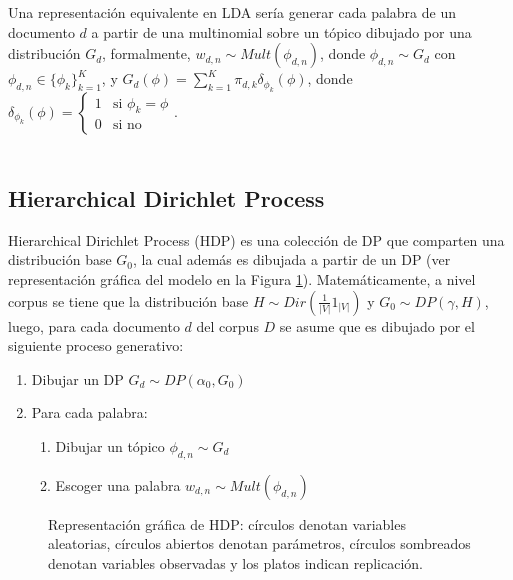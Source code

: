 \documentclass[letterpaper,12pt,oneside]{book} %
\begin{document}
Una representación equivalente en LDA sería generar cada palabra de un documento $d$ a partir de una multinomial sobre un tópico dibujado por una distribución $G_{d}$, formalmente, $w_{d,n}\sim Mult(\phi_{d,n})$, donde $\phi_{d,n} \sim G_{d}$ con $\phi_{d,n} \in \{\phi_{k}\}_{k=1}^{K}$, y $G_{d}(\phi)=\sum_{k=1}^{K}\pi_{d, k}\delta_{\phi_{k}}(\phi)$, donde $\delta_{\phi_{k}}(\phi) = \begin{cases}
    1 & \text{si $\phi_{k}=\phi$}  \\
    0 & \text{si no}
  \end{cases}$.\\\\

\subsection{Hierarchical Dirichlet Process}



Hierarchical Dirichlet Process (HDP) es una colección de DP que comparten una distribución base $G_{0}$, la cual además es dibujada a partir de un DP (ver representación gráfica del modelo en la Figura \ref{img:hdp}). Matemáticamente, a nivel corpus se tiene que la distribución base $H \sim Dir(\frac{1}{|V|}1_{|V|})$ y $G_{0} \sim DP(\gamma, H)$, luego, para cada documento $d$ del corpus $D$ se asume que es dibujado por el siguiente proceso generativo:
\begin{enumerate}
    \item Dibujar un DP $G_{d} \sim DP(\alpha_{0}, G_{0})$
    \item Para cada palabra:
    \begin{enumerate}
        \item Dibujar un tópico $\phi_{d,n}\sim G_{d}$
        \item Escoger una palabra $w_{d,n} \sim Mult(\phi_{d,n})$
    \end{enumerate}
\end{enumerate}

\begin{figure}
  \centering
\caption{Representación gráfica de HDP: círculos denotan variables aleatorias, círculos abiertos denotan parámetros, círculos sombreados denotan variables observadas y los platos indican replicación.}
\label{img:hdp}
\end{figure}
\end{document}
